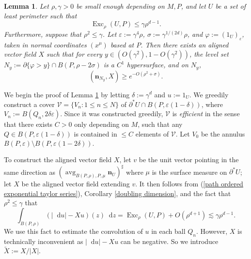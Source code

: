 \documentclass[reqno,11pt]{amsart}
\DeclareMathOperator{\avg}{avg}
\DeclareMathOperator{\Exc}{Exc}
\newcommand*\dif{\mathop{}\!\mathrm{d}}
\newcommand{\normal}{\mathbf n}
\newcommand{\dfn}[1]{\emph{#1}\index{#1}}
\newtheorem{lemma}[theorem]{Lemma}
\theoremstyle{definition}
\numberwithin{equation}{section}
\begin{document}
\begin{lemma}\label{main mollifier lemma}
Let $\rho, \gamma > 0$ be small enough depending on $M, P$, and let $U$ be a set of least perimeter such that
\begin{equation}\label{hypothesis on main mollifier lemma}
\Exc_\rho(U, P) \leq \gamma \rho^{d - 1}.
\end{equation}
Furthermore, suppose that $\rho^2 \leq \gamma$.
Let $\varepsilon := \gamma^4\rho$, $\sigma := \gamma^{1/(2d)} \rho$, and $\varphi := (1_U)_\varepsilon$, taken in normal coordinates $(x^\mu)$ based at $P$.
Then there exists an aligned vector field $X$ such that for every $y \in (O(\gamma^2), 1 - O(\gamma^2))$, the level set $N_y := \partial \{\varphi > y\} \cap B(P, \rho - 2\sigma)$ is a $C^1$ hypersurface, and on $N_y$,
\begin{equation}\label{claim on main mollifier lemma}
    (\normal_{N_y}, X) \geq e^{-O(\rho^2 + \sigma)}.
\end{equation}
\end{lemma}

We begin the proof of Lemma \ref{main mollifier lemma} by letting $\delta := \gamma^d$ and $u := 1_U$.
We greedily construct a cover $\mathcal V = \{V_n: 1 \leq n \leq N\}$ of $\partial^* U \cap B(P, \varepsilon(1 - \delta))$, where $V_n := B(Q_n, 2\delta\varepsilon)$.
Since it was constructed greedily, $\mathcal V$ is \dfn{efficient} in the sense that there exists $C > 0$ only depending on $M$, such that any $Q \in B(P, \varepsilon(1 - \delta))$ is contained in $\leq C$ elements of $\mathcal V$.
Let $V_0$ be the annulus $B(P, \varepsilon) \setminus B(P, \varepsilon(1 - 2\delta))$.

To construct the aligned vector field $X$, let $v$ be the unit vector pointing in the same direction as $(\avg_{B(P, \rho), P, \mu} \normal_U)^\sharp$ where $\mu$ is the surface measure on $\partial^* U$; let $X$ be the aligned vector field extending $v$.
It then follows from (\ref{path ordered exponential taylor series}), Corollary \ref{doubling dimension}, and the fact that $\rho^2 \leq \gamma$ that 
\begin{equation}\label{hypothesis on mollifier sublemma}
\int_{B(P, \rho)} (|\dif u| - Xu)(z) \dif z = \Exc_\rho(U, P) + O(\rho^{d + 1}) \lesssim \gamma \rho^{d - 1}.
\end{equation}
We use this fact to estimate the convolution of $u$ in each ball $Q_n$.
However, $X$ is technically inconvenient as $|\dif u| - Xu$ can be negative. 
So we introduce $\tilde X := X/|X|$.
\end{document}
